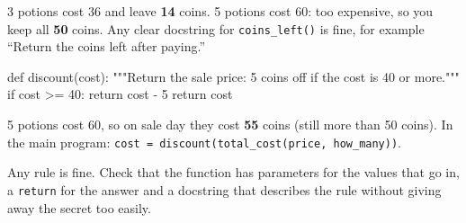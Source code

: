 \begin{answer}
3 potions cost 36 and leave \textbf{14} coins. 5 potions cost 60: too expensive, so you keep all \textbf{50} coins.
Any clear docstring for \texttt{coins\_left()} is fine, for example \enquote{Return the coins left after paying.}
\end{answer}

\begin{answer}
\begin{pycode}
def discount(cost):
    """Return the sale price: 5 coins off if the cost is 40 or more."""
    if cost >= 40:
        return cost - 5
    return cost
\end{pycode}
5 potions cost 60, so on sale day they cost \textbf{55} coins (still more than 50 coins).
In the main program: \texttt{cost = discount(total\_cost(price, how\_many))}.
\end{answer}

\begin{answer}
Any rule is fine. Check that the function has parameters for the values that go in, a \texttt{return} for the answer
and a docstring that describes the rule without giving away the secret too easily.
\end{answer}
